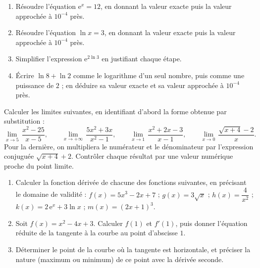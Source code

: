 \begin{exercice}
\begin{enumerate}
\item Résoudre l'équation $\mathrm{e}^{x} = 12$, en donnant la valeur exacte puis la valeur approchée à $10^{-4}$ près.
\item Résoudre l'équation $\ln x = 3$, en donnant la valeur exacte puis la valeur approchée à $10^{-4}$ près.
\item Simplifier l'expression $\mathrm{e}^{2\ln 3}$ en justifiant chaque étape.
\item Écrire $\ln 8 + \ln 2$ comme le logarithme d'un seul nombre, puis comme une puissance de $2$ ; en déduire sa valeur exacte et sa valeur approchée à $10^{-4}$ près.
\end{enumerate}
\end{exercice}

\begin{exercice}
Calculer les limites suivantes, en identifiant d'abord la forme obtenue par substitution :
\[
\lim_{x \to 5}\,\frac{x^{2} - 25}{x - 5}, \qquad \lim_{x \to +\infty}\,\frac{5x^{2} + 3x}{x^{2} - 1}, \qquad \lim_{x \to 1}\,\frac{x^{2} + 2x - 3}{x - 1}, \qquad \lim_{x \to 0}\,\frac{\sqrt{x+4} - 2}{x}.
\]
Pour la dernière, on multipliera le numérateur et le dénominateur par l'expression conjuguée $\sqrt{x+4} + 2$. Contrôler chaque résultat par une valeur numérique proche du point limite.
\end{exercice}

\begin{exercice}
\begin{enumerate}
\item Calculer la fonction dérivée de chacune des fonctions suivantes, en précisant le domaine de validité :
  $f(x) = 5x^{3} - 2x + 7$ ; \quad $g(x) = 3\sqrt{x}$ ; \quad $h(x) = \dfrac{4}{x^{2}}$ ; \quad $k(x) = 2\,\mathrm{e}^{x} + 3\ln x$ ; \quad $m(x) = (2x + 1)^{3}$.
\item Soit $f(x) = x^{2} - 4x + 3$. Calculer $f(1)$ et $f'(1)$, puis donner l'équation réduite de la tangente à la courbe au point d'abscisse $1$.
\item Déterminer le point de la courbe où la tangente est horizontale, et préciser la nature (maximum ou minimum) de ce point avec la dérivée seconde.
\end{enumerate}
\end{exercice}

